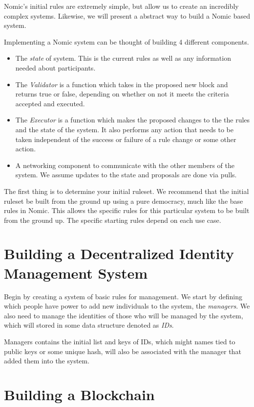 \documentclass[11pt,letterpaper]{article}
\begin{document}
	
	Nomic's initial rules are extremely simple, but allow us to create an incredibly complex systems.
	Likewise, we will present a abstract way to build a Nomic based system.
	
	Implementing a Nomic system can be thought of building 4 different components.
	\begin{itemize}
		\item The \textit{state} of system.  This is the current rules as well as any information needed about participants.
		\item The \textit{Validator}  is  a function which takes in the proposed new block and  returns true or false, depending on whether on not it meets the criteria accepted and executed.
		\item The \textit{Executor} is a function which makes the proposed changes to the the rules and the state of the system.  It also performs any action that needs to be taken independent of the success or failure of a rule change or some other action.
		\item A networking component to communicate with the other members of the system.  We assume updates to the state and proposals are done via pulls.
	\end{itemize}
	
	The first thing is to determine your initial ruleset.
	We recommend that the initial ruleset be built from the ground up using a pure democracy, much like the base rules in Nomic.
	This allows the specific rules for this particular system to be built from the ground up.
	The specific starting rules depend on each use case.
	
	
	\section{Building a Decentralized Identity Management System}
	
	Begin by creating a system of basic rules for management.
	We start by defining which people have power to add new individuals to the system, the \textit{managers}.
	We also need to manage the identities of those who will be managed by the system, which will stored in some data structure denoted as \textit{IDs}.
	
	
	Managers contains the initial list and keys of
	IDs, which might names tied to public keys or some unique hash, will also be associated with the manager that added them into the system.
	
	
	
	\section{Building a Blockchain}
	
\end{document}
